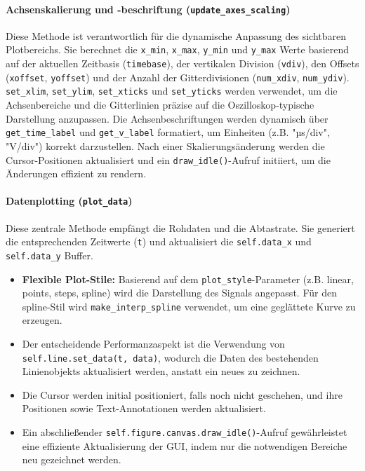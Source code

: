 \documentclass[a4paper, portrait, 12pt]{scrartcl} %
\begin{document}
\paragraph{Achsenskalierung und -beschriftung (\texttt{update\_axes\_scaling})}
Diese Methode ist verantwortlich für die dynamische Anpassung des sichtbaren Plotbereichs. Sie berechnet die \texttt{x\_min}, \texttt{x\_max}, \texttt{y\_min} und \texttt{y\_max} Werte basierend auf der aktuellen Zeitbasis (\texttt{timebase}), der vertikalen Division (\texttt{vdiv}), den Offsets (\texttt{xoffset}, \texttt{yoffset}) und der Anzahl der Gitterdivisionen (\texttt{num\_xdiv}, \texttt{num\_ydiv}). \texttt{set\_xlim}, \texttt{set\_ylim}, \texttt{set\_xticks} und \texttt{set\_yticks} werden verwendet, um die Achsenbereiche und die Gitterlinien präzise auf die Oszilloskop-typische Darstellung anzupassen. Die Achsenbeschriftungen werden dynamisch über \\\texttt{get\_time\_label} und \texttt{get\_v\_label} formatiert, um Einheiten (z.B. "µs/div", "V/div") korrekt darzustellen. Nach einer Skalierungsänderung werden die Cursor-Positionen aktualisiert und ein \texttt{draw\_idle()}-Aufruf initiiert, um die Änderungen effizient zu rendern.

\paragraph{Datenplotting (\texttt{plot\_data})}
Diese zentrale Methode empfängt die Rohdaten und die Abtastrate. Sie generiert die entsprechenden Zeitwerte (\texttt{t}) und aktualisiert die \texttt{self.data\_x} und \texttt{self.data\_y} Buffer.
\begin{itemize}
    \item \textbf{Flexible Plot-Stile:} Basierend auf dem \texttt{plot\_style}-Parameter (z.B. linear, points, steps, spline) wird die Darstellung des Signals angepasst. Für den spline-Stil wird \texttt{make\_interp\_spline} verwendet, um eine geglättete Kurve zu erzeugen.
    \item Der entscheidende Performanzaspekt ist die Verwendung von \texttt{self.line.set\_data(t, data)}, wodurch die Daten des bestehenden Linienobjekts aktualisiert werden, anstatt ein neues zu zeichnen.
    \item Die Cursor werden initial positioniert, falls noch nicht geschehen, und ihre Positionen sowie Text-Annotationen werden aktualisiert.
    \item Ein abschließender \texttt{self.figure.canvas.draw\_idle()}-Aufruf gewährleistet eine effiziente Aktualisierung der GUI, indem nur die notwendigen Bereiche neu gezeichnet werden.
\end{itemize}
\end{document}
